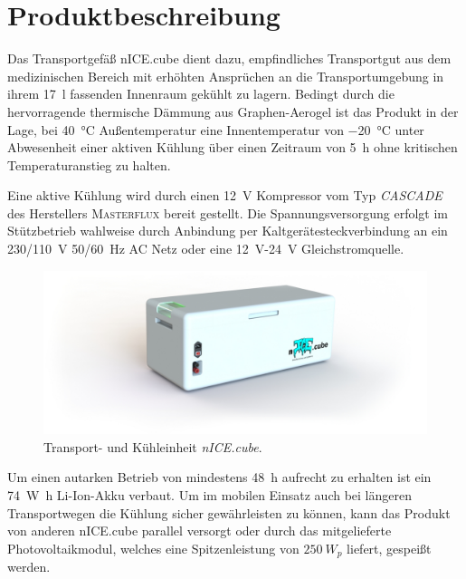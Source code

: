 \chapter{Produktbeschreibung}
	Das Transportgefäß \frq nICE.cube\flq{} dient dazu, empfindliches Transportgut aus dem medizinischen Bereich mit erhöhten Ansprüchen an die Transportumgebung
	in ihrem \SI{17}{\litre} fassenden Innenraum gekühlt zu lagern. Bedingt durch die hervorragende thermische Dämmung aus Graphen-Aerogel ist das Produkt
	in der Lage, bei \SI{40}{\celsius} Außentemperatur eine Innentemperatur von \SI{-20}{\celsius} unter Abwesenheit einer aktiven Kühlung über einen Zeitraum
	von \SI{5}{\hour} ohne kritischen Temperaturanstieg zu halten.\par\smallskip

	Eine aktive Kühlung wird durch einen \SI{12}{\volt} Kompressor vom Typ \textit{CASCADE} des Herstellers \textsc{Masterflux} bereit gestellt. Die Spannungsversorgung
	erfolgt im Stützbetrieb wahlweise durch Anbindung per Kaltgerätesteckverbindung an ein \SI{230/110}{\volt} \SI{50/60}{\hertz} AC Netz oder eine \SI{12}{\volt}-\SI{24}{\volt} Gleichstromquelle.\par\smallskip

	\begin{figure}[h]
		\centering
		\includegraphics[width=\textwidth]{assets/iso_edit.jpg}
		\caption[Transport- und Kühleinheit \textit{nICE.cube}.]{Transport- und Kühleinheit \textit{nICE.cube}.}
		\label{fig:box side render}
	\end{figure}
	Um einen autarken Betrieb von mindestens \SI{48}{\hour} aufrecht zu erhalten ist ein \SI{74}{\watt\hour} Li-Ion-Akku verbaut. Um im mobilen Einsatz auch bei längeren
	Transportwegen die Kühlung sicher gewährleisten zu können, kann das Produkt von anderen \frq nICE.cube\flq{} parallel versorgt oder durch das mitgelieferte Photovoltaikmodul, welches eine Spitzenleistung von $ \SI{250}{W_p} $ liefert, gespeißt werden.\par\smallskip

